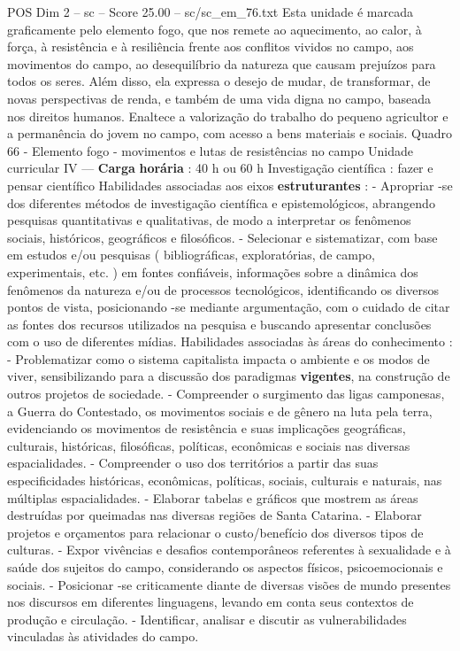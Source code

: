 \begin{textsample}{POS Dim 2 – sc – Score 25.00 – sc/sc\_em\_76.txt}
Esta unidade é marcada graficamente pelo elemento fogo, que nos remete ao aquecimento, ao calor, à força, à resistência e à resiliência frente aos conflitos vividos no campo, aos movimentos do campo, ao desequilíbrio da natureza que causam prejuízos para todos os seres.
Além disso, ela expressa o desejo de mudar, de transformar, de novas perspectivas de renda, e também de uma vida digna no campo, baseada nos direitos humanos.
Enaltece a valorização do trabalho do pequeno agricultor e a permanência do jovem no campo, com acesso a bens materiais e sociais.
Quadro 66 - Elemento fogo - movimentos e lutas de resistências no campo Unidade curricular IV — \textbf{Carga} \textbf{horária} : 40 h ou 60 h Investigação científica : fazer e pensar científico Habilidades associadas aos eixos \textbf{estruturantes} : - Apropriar -se dos diferentes métodos de investigação científica e epistemológicos, abrangendo pesquisas quantitativas e qualitativas, de modo a interpretar os fenômenos sociais, históricos, geográficos e filosóficos. - Selecionar e sistematizar, com base em estudos e/ou pesquisas ( bibliográficas, exploratórias, de campo, experimentais, etc. ) em fontes confiáveis, informações sobre a dinâmica dos fenômenos da natureza e/ou de processos tecnológicos, identificando os diversos pontos de vista, posicionando -se mediante argumentação, com o cuidado de citar as fontes dos recursos utilizados na pesquisa e buscando apresentar conclusões com o uso de diferentes mídias.
Habilidades associadas às áreas do conhecimento : - Problematizar como o sistema capitalista impacta o ambiente e os modos de viver, sensibilizando para a discussão dos paradigmas \textbf{vigentes}, na construção de outros projetos de sociedade. - Compreender o surgimento das ligas camponesas, a Guerra do Contestado, os movimentos sociais e de gênero na luta pela terra, evidenciando os movimentos de resistência e suas implicações geográficas, culturais, históricas, filosóficas, políticas, econômicas e sociais nas diversas espacialidades. - Compreender o uso dos territórios a partir das suas especificidades históricas, econômicas, políticas, sociais, culturais e naturais, nas múltiplas espacialidades. - Elaborar tabelas e gráficos que mostrem as áreas destruídas por queimadas nas diversas regiões de Santa Catarina. - Elaborar projetos e orçamentos para relacionar o custo/benefício dos diversos tipos de culturas. - Expor vivências e desafios contemporâneos referentes à sexualidade e à saúde dos sujeitos do campo, considerando os aspectos físicos, psicoemocionais e sociais. - Posicionar -se criticamente diante de diversas visões de mundo presentes nos discursos em diferentes linguagens, levando em conta seus contextos de produção e circulação. - Identificar, analisar e discutir as vulnerabilidades vinculadas às atividades do campo.

\end{textsample}
